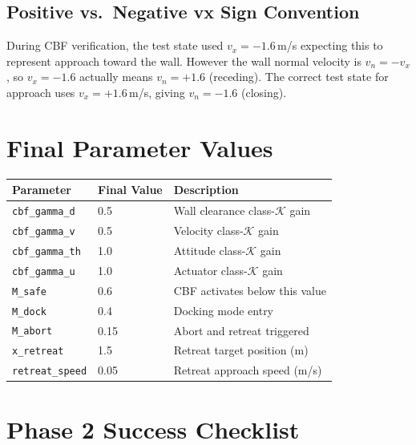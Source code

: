 \documentclass[12pt]{article}
\begin{document}
\subsection{Positive vs.\ Negative vx Sign Convention}

During CBF verification, the test state used $v_x = -1.6$\,m/s
expecting this to represent approach toward the wall. However the
wall normal velocity is $v_n = -v_x$, so $v_x = -1.6$ actually
means $v_n = +1.6$ (receding). The correct test state for approach
uses $v_x = +1.6$\,m/s, giving $v_n = -1.6$ (closing).

\section{Final Parameter Values}

\begin{center}
\begin{tabular}{lll}
\toprule
\textbf{Parameter} & \textbf{Final Value} & \textbf{Description} \\
\midrule
\texttt{cbf\_gamma\_d}  & 0.5  & Wall clearance class-$\mathcal{K}$ gain \\
\texttt{cbf\_gamma\_v}  & 0.5  & Velocity class-$\mathcal{K}$ gain \\
\texttt{cbf\_gamma\_th} & 1.0  & Attitude class-$\mathcal{K}$ gain \\
\texttt{cbf\_gamma\_u}  & 1.0  & Actuator class-$\mathcal{K}$ gain \\
\texttt{M\_safe}        & 0.6  & CBF activates below this value \\
\texttt{M\_dock}        & 0.4  & Docking mode entry \\
\texttt{M\_abort}       & 0.15 & Abort and retreat triggered \\
\texttt{x\_retreat}     & 1.5  & Retreat target position (m) \\
\texttt{retreat\_speed} & 0.05 & Retreat approach speed (m/s) \\
\bottomrule
\end{tabular}
\end{center}

\section{Phase 2 Success Checklist}
\end{document}
